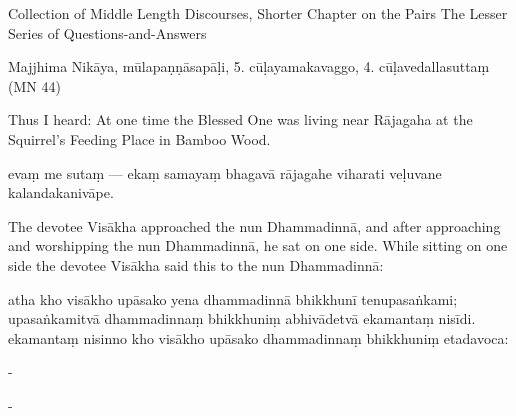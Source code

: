 \begin{samepage}
\begin{leftcolumn*}
Collection of Middle Length Discourses, Shorter Chapter on the Pairs
The Lesser Series of Questions-and-Answers
\end{leftcolumn*}

\begin{rightcolumn}
Majjhima Nikāya, mūlapaṇṇāsapāḷi, 5. cūḷayamakavaggo,
4. cūḷavedallasuttaṃ (MN 44)
\end{rightcolumn}
\end{samepage}

\begin{samepage}
\begin{leftcolumn*}
Thus I heard: At one time the Blessed One was living near Rājagaha at the Squirrel’s Feeding Place in Bamboo Wood.
\end{leftcolumn*}

\begin{rightcolumn}
evaṃ me sutaṃ — ekaṃ samayaṃ bhagavā rājagahe viharati veḷuvane kalandakanivāpe.
\end{rightcolumn}
\end{samepage}

\begin{samepage}
\begin{leftcolumn*}
The devotee Visākha approached the nun Dhammadinnā, and after approaching and worshipping the nun Dhammadinnā, he sat on one side. While sitting on one side the devotee Visākha said this to the nun Dhammadinnā:
\end{leftcolumn*}

\begin{rightcolumn}
atha kho visākho upāsako yena dhammadinnā bhikkhunī tenupasaṅkami; upasaṅkamitvā dhammadinnaṃ bhikkhuniṃ abhivādetvā ekamantaṃ nisīdi. ekamantaṃ nisinno kho visākho upāsako dhammadinnaṃ bhikkhuniṃ etadavoca:
\end{rightcolumn}
\end{samepage}

\begin{samepage}
\begin{leftcolumn*}
-
\end{leftcolumn*}

\begin{rightcolumn}
-
\end{rightcolumn}
\end{samepage}

